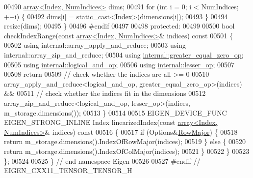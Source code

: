 \begin{DoxyCode}
00490       \hyperlink{class_eigen_1_1array}{array<Index, NumIndices>} dims;
00491       \textcolor{keywordflow}{for} (\textcolor{keywordtype}{int} i = 0; i < NumIndices; ++i) \{
00492         dims[i] = \textcolor{keyword}{static\_cast<}Index\textcolor{keyword}{>}(dimensions[i]);
00493       \}
00494       resize(dims);
00495     \}
00496 \textcolor{preprocessor}{#endif}
00497 
00498   \textcolor{keyword}{protected}:
00499 
00500     \textcolor{keywordtype}{bool} checkIndexRange(\textcolor{keyword}{const} \hyperlink{class_eigen_1_1array}{array<Index, NumIndices>}& indices)\textcolor{keyword}{ const}
00501 \textcolor{keyword}{    }\{
00502       \textcolor{keyword}{using} internal::array\_apply\_and\_reduce;
00503       \textcolor{keyword}{using} internal::array\_zip\_and\_reduce;
00504       \textcolor{keyword}{using} \hyperlink{struct_eigen_1_1internal_1_1greater__equal__zero__op}{internal::greater\_equal\_zero\_op};
00505       \textcolor{keyword}{using} \hyperlink{struct_eigen_1_1internal_1_1logical__and__op}{internal::logical\_and\_op};
00506       \textcolor{keyword}{using} \hyperlink{struct_eigen_1_1internal_1_1lesser__op}{internal::lesser\_op};
00507 
00508       \textcolor{keywordflow}{return}
00509         \textcolor{comment}{// check whether the indices are all >= 0}
00510         array\_apply\_and\_reduce<logical\_and\_op, greater\_equal\_zero\_op>(indices) &&
00511         \textcolor{comment}{// check whether the indices fit in the dimensions}
00512         array\_zip\_and\_reduce<logical\_and\_op, lesser\_op>(indices, m\_storage.dimensions());
00513     \}
00514 
00515     EIGEN\_DEVICE\_FUNC EIGEN\_STRONG\_INLINE Index linearizedIndex(\textcolor{keyword}{const} 
      \hyperlink{class_eigen_1_1array}{array<Index, NumIndices>}& indices)\textcolor{keyword}{ const}
00516 \textcolor{keyword}{    }\{
00517       \textcolor{keywordflow}{if} (Options&\hyperlink{group__enums_ggaacded1a18ae58b0f554751f6cdf9eb13acfcde9cd8677c5f7caf6bd603666aae3}{RowMajor}) \{
00518         \textcolor{keywordflow}{return} m\_storage.dimensions().IndexOfRowMajor(indices);
00519       \} \textcolor{keywordflow}{else} \{
00520         \textcolor{keywordflow}{return} m\_storage.dimensions().IndexOfColMajor(indices);
00521       \}
00522     \}
00523 \};
00524 
00525 \} \textcolor{comment}{// end namespace Eigen}
00526 
00527 \textcolor{preprocessor}{#endif // EIGEN\_CXX11\_TENSOR\_TENSOR\_H}
\end{DoxyCode}
